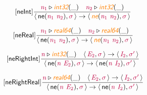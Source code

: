 \documentclass[10pt,leqno,fleqn]{article}
\newcommand{\artVariable}[1]{\mbox{\color{purple}\em #1\/}}
\newcommand{\artConstructor}[1]{\mbox{\sf #1}}
\newcommand{\artSpecial}[1]{\mbox{\color{orange}\sf\em #1}}
\begin{document}
\begin{equation}
\tag*{[\artConstructor{\sf neInt}]}
\begin{split}\frac{ \artVariable{n$_{1}$}\triangleright \artSpecial{int32}(\_) \quad  \artVariable{n$_{2}$}\triangleright \artSpecial{int32}(\_) }{\langle\, \artConstructor{\sf ne}(\artVariable{n$_{1}$}\ \artVariable{n$_{2}$}), \artVariable{$\sigma$}\,\rangle \rightarrow \langle\, \artSpecial{ne}(\artVariable{n$_{1}$}\ \artVariable{n$_{2}$}), \artVariable{$\sigma$}\,\rangle }
\end{split}
\end{equation}

\begin{equation}
\tag*{[\artConstructor{\sf neReal}]}
\begin{split}\frac{ \artVariable{n$_{1}$}\triangleright \artSpecial{real64}(\_) \quad  \artVariable{n$_{2}$}\triangleright \artSpecial{real64}(\_) }{\langle\, \artConstructor{\sf ne}(\artVariable{n$_{1}$}\ \artVariable{n$_{2}$}), \artVariable{$\sigma$}\,\rangle \rightarrow \langle\, \artSpecial{ne}(\artVariable{n$_{1}$}\ \artVariable{n$_{2}$}), \artVariable{$\sigma$}\,\rangle }
\end{split}
\end{equation}

\begin{equation}
\tag*{[\artConstructor{\sf neRightInt}]}
\begin{split}\frac{ \artVariable{n}\triangleright \artSpecial{int32}(\_) \quad \langle\, \artVariable{E$_{2}$}, \artVariable{$\sigma$}\,\rangle \rightarrow \langle\, \artVariable{I$_{2}$}, \artVariable{$\sigma$\/$^\prime$}\,\rangle }{\langle\, \artConstructor{\sf ne}(\artVariable{n}\ \artVariable{E$_{2}$}), \artVariable{$\sigma$}\,\rangle \rightarrow \langle\, \artConstructor{\sf ne}(\artVariable{n}\ \artVariable{I$_{2}$}), \artVariable{$\sigma$\/$^\prime$}\,\rangle }
\end{split}
\end{equation}

\begin{equation}
\tag*{[\artConstructor{\sf neRightReal}]}
\begin{split}\frac{ \artVariable{n}\triangleright \artSpecial{real64}(\_) \quad \langle\, \artVariable{E$_{2}$}, \artVariable{$\sigma$}\,\rangle \rightarrow \langle\, \artVariable{I$_{2}$}, \artVariable{$\sigma$\/$^\prime$}\,\rangle }{\langle\, \artConstructor{\sf ne}(\artVariable{n}\ \artVariable{E$_{2}$}), \artVariable{$\sigma$}\,\rangle \rightarrow \langle\, \artConstructor{\sf ne}(\artVariable{n}\ \artVariable{I$_{2}$}), \artVariable{$\sigma$\/$^\prime$}\,\rangle }
\end{split}
\end{equation}
\end{document}
